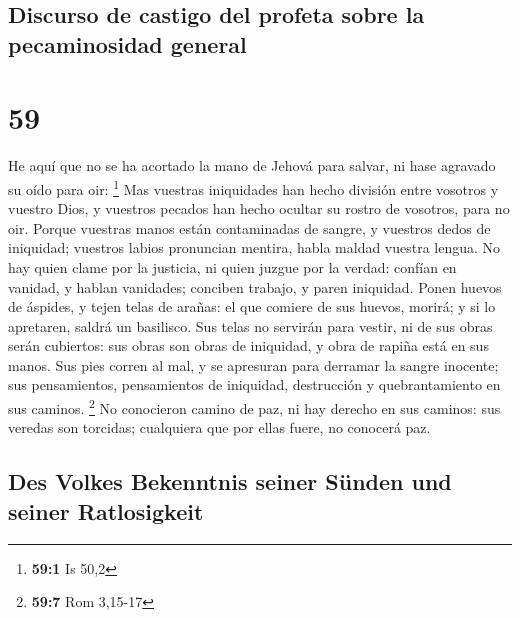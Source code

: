 \hypertarget{discurso-de-castigo-del-profeta-sobre-la-pecaminosidad-general}{%
\subsection{Discurso de castigo del profeta sobre la pecaminosidad
general}\label{discurso-de-castigo-del-profeta-sobre-la-pecaminosidad-general}}

\hypertarget{section-58}{%
\section{59}\label{section-58}}

 He aquí que no se ha acortado la mano de Jehová para
salvar, ni hase agravado su oído para oir: \footnote{\textbf{59:1} Is
  50,2}  Mas vuestras iniquidades han hecho división entre
vosotros y vuestro Dios, y vuestros pecados han hecho ocultar su rostro
de vosotros, para no oir.  Porque vuestras manos están
contaminadas de sangre, y vuestros dedos de iniquidad; vuestros labios
pronuncian mentira, habla maldad vuestra lengua.  No hay
quien clame por la justicia, ni quien juzgue por la verdad: confían en
vanidad, y hablan vanidades; conciben trabajo, y paren iniquidad.
 Ponen huevos de áspides, y tejen telas de arañas: el que
comiere de sus huevos, morirá; y si lo apretaren, saldrá un basilisco.
 Sus telas no servirán para vestir, ni de sus obras serán
cubiertos: sus obras son obras de iniquidad, y obra de rapiña está en
sus manos.  Sus pies corren al mal, y se apresuran para
derramar la sangre inocente; sus pensamientos, pensamientos de
iniquidad, destrucción y quebrantamiento en sus caminos. \footnote{\textbf{59:7}
  Rom 3,15-17}  No conocieron camino de paz, ni hay
derecho en sus caminos: sus veredas son torcidas; cualquiera que por
ellas fuere, no conocerá paz.

\hypertarget{des-volkes-bekenntnis-seiner-suxfcnden-und-seiner-ratlosigkeit}{%
\subsection{Des Volkes Bekenntnis seiner Sünden und seiner
Ratlosigkeit}\label{des-volkes-bekenntnis-seiner-suxfcnden-und-seiner-ratlosigkeit}}

